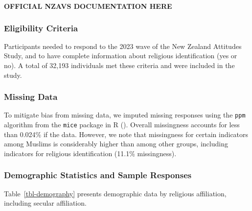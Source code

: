\documentclass[
  single column]{article}
\begin{document}
\textbf{OFFICIAL NZAVS DOCUMENTATION HERE}

\subsubsection{Eligibility Criteria}\label{eligibility-criteria}

Participants needed to respond to the 2023 wave of the New Zealand
Attitudes Study, and to have complete information about religious
identification (yes or no). A total of 32,193 individuals met these
criteria and were included in the study.

\subsubsection{Missing Data}\label{missing-data}

To mitigate bias from missing data, we imputed missing responses using
the \texttt{ppm} algorithm from the \texttt{mice} package in R
(). Overall missingness
accounts for less than 0.024\% if the data. However, we note that
missingness for certain indicators among Muslims is considerably higher
than among other groups, including indicators for religious
identification (11.1\% missingness).

\subsubsection{Demographic Statistics and Sample
Responses}\label{demographic-statistics-and-sample-responses}

Table~\ref{tbl-demography} presents demographic data by religious
affiliation, including secular affiliation.
\end{document}
